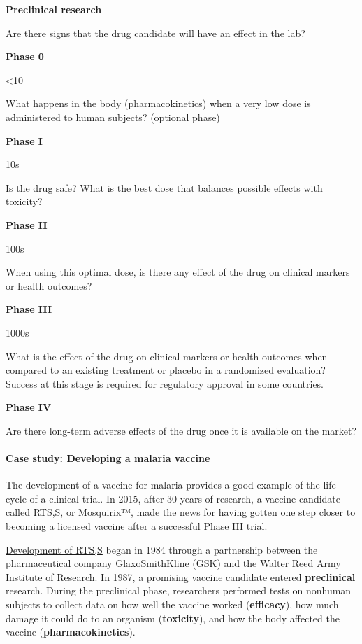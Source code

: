 \documentclass[justified,twoside,symmetric,]{tufte-book}
\begin{document}
\textbf{Preclinical research}

Are there signs that the drug candidate will have an effect in the lab?

\textbf{Phase 0}

\textless10

What happens in the body (pharmacokinetics) when a very low dose is administered to human subjects? (optional phase)

\textbf{Phase I}

10s

Is the drug safe? What is the best dose that balances possible effects with toxicity?

\textbf{Phase II}

100s

When using this optimal dose, is there any effect of the drug on clinical markers or health outcomes?

\textbf{Phase III}

1000s

What is the effect of the drug on clinical markers or health outcomes when compared to an existing treatment or placebo in a randomized evaluation? Success at this stage is required for regulatory approval in some countries.

\textbf{Phase IV}

Are there long-term adverse effects of the drug once it is available on the market?

\hypertarget{case-study-developing-a-malaria-vaccine}{%
\paragraph*{Case study: Developing a malaria vaccine}\label{case-study-developing-a-malaria-vaccine}}

The development of a vaccine for malaria provides a good example of the life cycle of a clinical trial. In 2015, after 30 years of research, a vaccine candidate called RTS,S, or Mosquirix™, \href{http://money.cnn.com/2015/07/24/news/malaria-vaccine-bill-gates/}{made the news} for having gotten one step closer to becoming a licensed vaccine after a successful Phase III trial.

\href{http://malariavaccine.org/files/UpdatedRTSS_FactSheet_21April2010.pdf}{Development of RTS,S} began in 1984 through a partnership between the pharmaceutical company GlaxoSmithKline (GSK) and the Walter Reed Army Institute of Research. In 1987, a promising vaccine candidate entered \textbf{preclinical} research. During the preclinical phase, researchers performed tests on nonhuman subjects to collect data on how well the vaccine worked (\textbf{efficacy}), how much damage it could do to an organism (\textbf{toxicity}), and how the body affected the vaccine (\textbf{pharmacokinetics}).
\end{document}
